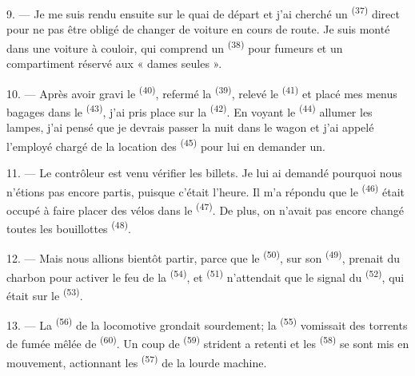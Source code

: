 9. --- Je me suis rendu ensuite sur le quai de départ et j'ai cherché un
 \textsuperscript{(37)} direct pour ne pas être obligé de changer
de voiture en cours de route. Je suis monté dans une voiture à couloir, qui
comprend un  \textsuperscript{(38)} pour fumeurs et un
compartiment réservé aux « dames seules ».

\VUsaut{3.0mm}

10. --- Après avoir gravi le  \textsuperscript{(40)}, refermé
la  \textsuperscript{(39)}, relevé le 
\textsuperscript{(41)} et placé mes menus bagages dans le 
\textsuperscript{(43)}, j'ai pris place sur la 
\textsuperscript{(42)}. En voyant le  \textsuperscript{(44)}
allumer les lampes, j'ai pensé que je devrais passer la nuit dans le wagon et
j'ai appelé l'employé chargé de la location des 
\textsuperscript{(45)} pour lui en demander un.

11. --- Le contrôleur est venu vérifier les billets. Je lui ai demandé pourquoi
nous n'étions pas encore partis, puisque c'était l'heure. Il m'a répondu que le
 \textsuperscript{(46)} était occupé à faire placer des
vélos dans le  \textsuperscript{(47)}. De plus, on
n'avait pas encore changé toutes les bouillottes \textsuperscript{(48)}.

12. --- Mais nous allions bientôt partir, parce que le 
\textsuperscript{(50)}, sur son  \textsuperscript{(49)}, prenait
du charbon pour activer le feu de la  \textsuperscript{(54)},
et  \textsuperscript{(51)} n'attendait que le signal du
 \textsuperscript{(52)}, qui était sur le
 \textsuperscript{(53)}.

13. --- La  \textsuperscript{(56)} de la locomotive grondait
sourdement; la  \textsuperscript{(55)} vomissait des torrents de
fumée mêlée de  \textsuperscript{(60)}. Un coup de
 \textsuperscript{(59)} strident a retenti et les
 \textsuperscript{(58)} se sont mis en mouvement, actionnant les
 \textsuperscript{(57)} de la lourde machine.

\VUsaut{3.0mm}
\VUsaut{3.0mm}

